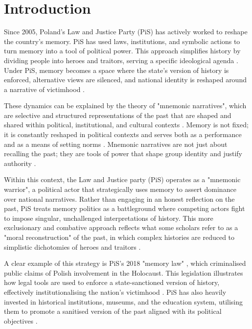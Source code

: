 \chapter[Introduction]{Introduction}
\label{Chap:Introduction}

Since 2005, Poland's Law and Justice Party (PiS) has actively worked to reshape the country's memory. PiS has used laws, institutions, and symbolic actions to turn memory into a tool of political power. This approach simplifies history by dividing people into heroes and traitors, serving a specific ideological agenda \citep{lazor_memory_2016}. Under PiS, memory becomes a space where the state’s version of history is enforced, alternative views are silenced, and national identity is reshaped around a narrative of victimhood \citep{stanczyk_commemorating_2014}.

These dynamics can be explained by the theory of "mnemonic narratives", which are selective and structured representations of the past that are shaped and shared within political, institutional, and cultural contexts \citep{assmann_transnational_2014}. Memory is not fixed; it is constantly reshaped in political contexts and serves both as a performance and as a means of setting norms \citep{olick_social_1998}. Mnemonic narratives are not just about recalling the past; they are tools of power that shape group identity and justify authority \citep{bernhard_notitle_2014}.

Within this context, the Law and Justice party (PiS) operates as a "mnemonic warrior", a political actor that strategically uses memory to assert dominance over national narratives. Rather than engaging in an honest reflection on the past, PiS treats memory politics as a battleground where competing actors fight to impose singular, unchallenged interpretations of history. This more exclusionary and combative approach reflects what some scholars refer to as a "moral reconstruction" of the past, in which complex histories are reduced to simplistic dichotomies of heroes and traitors \citep{brants_transitional_2013}.

A clear example of this strategy is PiS’s 2018 "memory law" \citep*{sejm_rzeczypospolitej_polskiej_obwieszczenie_2018}, which criminalised public claims of Polish involvement in the Holocaust. This legislation illustrates how legal tools are used to enforce a state-sanctioned version of history, effectively institutionalising the nation's victimhood \citep{verovsek_caught_2021}. PiS has also heavily invested in historical institutions, museums, and the education system, utilising them to promote a sanitised version of the past aligned with its political objectives \citep{meijen_populist_2024}.


